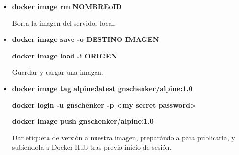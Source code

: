 \documentclass[12pt, twoside, openright]{report} %
\begin{document}
\begin{itemize}
	\item \textbf{docker image rm NOMBREoID}

	      Borra la imagen del servidor local.

	\item \textbf{docker image save -o DESTINO IMAGEN}

	      \textbf{docker image load -i ORIGEN}

	      Guardar y cargar una imagen.

	\item \textbf{docker image tag alpine:latest gnschenker/alpine:1.0}

	      \textbf{docker login -u gnschenker -p <my secret password>}

	      \textbf{docker image push gnschenker/alpine:1.0}

	      Dar etiqueta de versión a nuestra imagen, preparándola para publicarla, y subiendola a Docker Hub tras previo inicio de sesión.
\end{itemize}
\pagebreak
\end{document}
